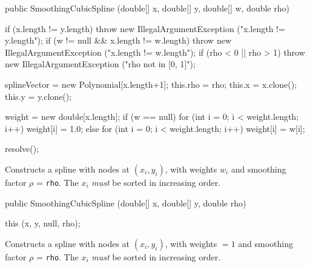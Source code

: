 \begin{code}

   public SmoothingCubicSpline (double[] x, double[] y, double[] w,
                                double rho)\begin{hide} {
      if (x.length != y.length)
         throw new IllegalArgumentException ("x.length != y.length");
      if (w != null && x.length != w.length)
         throw new IllegalArgumentException ("x.length != w.length");
      if (rho < 0 || rho > 1)
         throw new IllegalArgumentException ("rho not in [0, 1]");

      splineVector = new Polynomial[x.length+1];
      this.rho = rho;
      this.x = x.clone();
      this.y = y.clone();

      weight = new double[x.length];
      if (w == null) {
         for (int i = 0; i < weight.length; i++)
            weight[i] = 1.0;
      } else {
         for (int i = 0; i < weight.length; i++)
            weight[i] = w[i];
      }

      resolve();
   }\end{hide}
\end{code}
\begin{tabb}
   Constructs a spline with nodes at $(x_i, y_i)$,
   with weights $w_i$ and smoothing factor $\rho$ = \texttt{rho}.
   The $x_i$ \emph{must} be sorted in increasing order.
\end{tabb}
\begin{htmlonly}
\end{htmlonly}
\begin{code}

   public SmoothingCubicSpline (double[] x, double[] y, double rho) \begin{hide} {
      this (x, y, null, rho);
   }\end{hide}
\end{code}
\begin{tabb}
   Constructs a spline with nodes at $(x_i, y_i)$,
   with weights $= 1$ and smoothing factor $\rho$ = \texttt{rho}.
   The $x_i$ \emph{must} be sorted in increasing order.
\end{tabb}
\begin{htmlonly}
\end{htmlonly}

